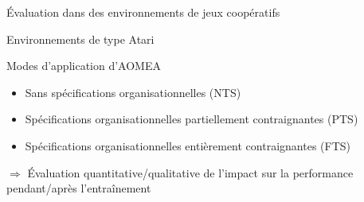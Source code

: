\begin{frame}{Évaluation dans des environnements de jeux coopératifs}
\begin{block}{Environnements de type Atari}
    \end{block}

    \begin{block}{Modes d'application d'AOMEA}
        \begin{itemize}
            \item Sans spécifications organisationnelles (NTS)
            \item Spécifications organisationnelles partiellement contraignantes (PTS)
            \item Spécifications organisationnelles entièrement contraignantes (FTS)
        \end{itemize}
    \end{block}

    $\Longrightarrow$ Évaluation quantitative/qualitative de l'impact sur la performance pendant/après l'entraînement

\end{frame}


